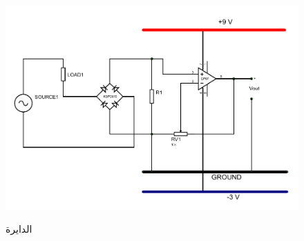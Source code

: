 \documentclass{article}
\begin{document}
\begin{figure}[!ht]
    \centering
    \includegraphics[width=.8\textwidth]{DIYCS.pdf}\\
    \caption{الدايرة}\label{fig:cir}
\end{figure}
\end{document}
